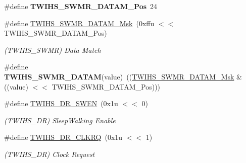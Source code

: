 \begin{DoxyCompactItemize}
\item 
\mbox{\label{group__SAMV71__TWIHS_ga34b88e4924a202bc799ac6d80677c145}} 
\#define {\bfseries T\+W\+I\+H\+S\+\_\+\+S\+W\+M\+R\+\_\+\+D\+A\+T\+A\+M\+\_\+\+Pos}~24
\item 
\mbox{\label{group__SAMV71__TWIHS_ga44cb1df1e94861a9fbb62974a8730e2f}} 
\#define \mbox{\hyperlink{group__SAMV71__TWIHS_ga44cb1df1e94861a9fbb62974a8730e2f}{T\+W\+I\+H\+S\+\_\+\+S\+W\+M\+R\+\_\+\+D\+A\+T\+A\+M\+\_\+\+Msk}}~(0xffu $<$$<$ T\+W\+I\+H\+S\+\_\+\+S\+W\+M\+R\+\_\+\+D\+A\+T\+A\+M\+\_\+\+Pos)
\begin{DoxyCompactList}\small\item\em (T\+W\+I\+H\+S\+\_\+\+S\+W\+MR) Data Match \end{DoxyCompactList}\item 
\mbox{\label{group__SAMV71__TWIHS_gaf81684051694e1b944089298917c1dcf}} 
\#define {\bfseries T\+W\+I\+H\+S\+\_\+\+S\+W\+M\+R\+\_\+\+D\+A\+T\+AM}(value)~((\mbox{\hyperlink{group__SAMV71__TWIHS_ga44cb1df1e94861a9fbb62974a8730e2f}{T\+W\+I\+H\+S\+\_\+\+S\+W\+M\+R\+\_\+\+D\+A\+T\+A\+M\+\_\+\+Msk}} \& ((value) $<$$<$ T\+W\+I\+H\+S\+\_\+\+S\+W\+M\+R\+\_\+\+D\+A\+T\+A\+M\+\_\+\+Pos)))
\item 
\mbox{\label{group__SAMV71__TWIHS_ga3c3438605028e5c636dbd32d1002adf4}} 
\#define \mbox{\hyperlink{group__SAMV71__TWIHS_ga3c3438605028e5c636dbd32d1002adf4}{T\+W\+I\+H\+S\+\_\+\+D\+R\+\_\+\+S\+W\+EN}}~(0x1u $<$$<$ 0)
\begin{DoxyCompactList}\small\item\em (T\+W\+I\+H\+S\+\_\+\+DR) Sleep\+Walking Enable \end{DoxyCompactList}\item 
\mbox{\label{group__SAMV71__TWIHS_ga0fb68e9a45b8a605c5532d131cfdaaa0}} 
\#define \mbox{\hyperlink{group__SAMV71__TWIHS_ga0fb68e9a45b8a605c5532d131cfdaaa0}{T\+W\+I\+H\+S\+\_\+\+D\+R\+\_\+\+C\+L\+K\+RQ}}~(0x1u $<$$<$ 1)
\begin{DoxyCompactList}\small\item\em (T\+W\+I\+H\+S\+\_\+\+DR) Clock Request \end{DoxyCompactList}\item 
\mbox{\label{group__SAMV71__TWIHS_gaa7e8e2c77a06988dfcdcbaab9f84df47}} 

\end{DoxyCompactItemize}
